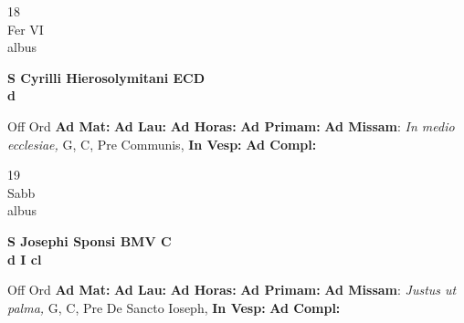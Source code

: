\documentclass[10pt, openany]{book}
\begin{document}
        \begin{center}
            \begin{minipage}{3.5in}
                \vspace{2em}
                \begin{minipage}{0.5in}
                    {\Huge 18} \\
                    {\normalsize Fer VI} \\
                    {\normalsize albus}
                \end{minipage}
                \begin{minipage}{3.0in}
                    \textbf{ \large S Cyrilli Hierosolymitani ECD \\
                    \textnormal{\normalsize d}} \\ 
                \end{minipage}
                \begin{justify}Off Ord
                    \textbf{Ad Mat: }
                    \textbf{Ad Lau: }
                    \textbf{Ad Horas: }
                    \textbf{Ad Primam: }\textbf{Ad Missam}: \textit{In medio ecclesiae,} G, C, Pre Communis,  
                    \textbf{In Vesp: }
                    \textbf{Ad Compl: }
                \end{justify}
            \end{minipage}
        \end{center}
    
        \begin{center}
            \begin{minipage}{3.5in}
                \vspace{2em}
                \begin{minipage}{0.5in}
                    {\Huge 19} \\
                    {\normalsize Sabb} \\
                    {\normalsize albus}
                \end{minipage}
                \begin{minipage}{3.0in}
                    \textbf{ \large S Josephi Sponsi BMV C \\
                    \textnormal{\normalsize d I cl}} \\ 
                \end{minipage}
                \begin{justify}Off Ord
                    \textbf{Ad Mat: }
                    \textbf{Ad Lau: }
                    \textbf{Ad Horas: }
                    \textbf{Ad Primam: }\textbf{Ad Missam}: \textit{Justus ut palma,} G, C, Pre De Sancto Ioseph,  
                    \textbf{In Vesp: }
                    \textbf{Ad Compl: }
                \end{justify}
            \end{minipage}
        \end{center}
    
\end{document}

